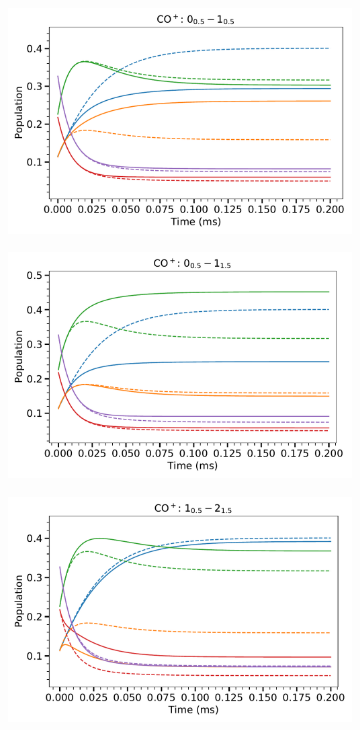 \begin{figure}[!htb]
    \centering
    \begin{subfigure}[b]{0.49\textwidth}
        \centering
        \includegraphics[width=1\textwidth]{chapters/CO+_ROSAA_paper/SI/CO^+_pop_ratio_0_0.5 - 1_0.5.pdf}
        \caption{}
    \end{subfigure}
    \hfill
    \begin{subfigure}[b]{0.49\textwidth}
        \centering
        \includegraphics[width=1\textwidth]{chapters/CO+_ROSAA_paper/SI/CO^+_pop_ratio_0_0.5 - 1_1.5.pdf}
        \caption{}
    \end{subfigure}
    \hfill
    \begin{subfigure}[b]{0.49\textwidth}
        \centering
        \includegraphics[width=1\textwidth]{chapters/CO+_ROSAA_paper/SI/CO^+_pop_ratio_1_0.5 - 2_1.5.pdf}

\end{subfigure}
\end{figure}
